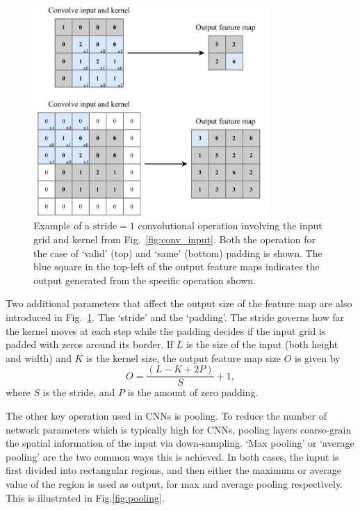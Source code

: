 \begin{figure} %
    \includegraphics[width=0.8\textwidth]{diagrams/6-cvn/conv_operation.pdf}
    \caption[Example of convolutional operation.]
    {Example of a $\mathrm{stride}=1$ convolutional operation involving the input grid and kernel
        from Fig.~\ref{fig:conv_input}. Both the operation for the case of `valid' (top) and
        `same' (bottom) padding is shown. The blue square in the top-left of the output feature
        maps indicates the output generated from the specific operation shown.}
    \label{fig:conv_operation}
\end{figure}

Two additional parameters that affect the output size of the feature map are also introduced in
Fig.~\ref{fig:conv_operation}. The `stride' and the `padding'. The stride governs how far the
kernel moves at each step while the padding decides if the input grid is padded with zeros around
its border. If $L$ is the size of the input (both height and width) and $K$ is the kernel size,
the output feature map size $O$ is given by
\begin{equation}
    O=\frac{(L-K+2P)}{S}+1,
    \label{eq:conv_size}
\end{equation}
where $S$ is the stride, and $P$ is the amount of zero padding.

The other key operation used in CNNs is pooling. To reduce the number of network parameters which
is typically high for CNNs, pooling layers coarse-grain the spatial information of the input via
down-sampling. `Max pooling' or `average pooling' are the two common ways this is achieved. In
both cases, the input is first divided into rectangular regions, and then either the maximum or
average value of the region is used as output, for max and average pooling respectively. This is
illustrated in Fig.\ref{fig:pooling}.

